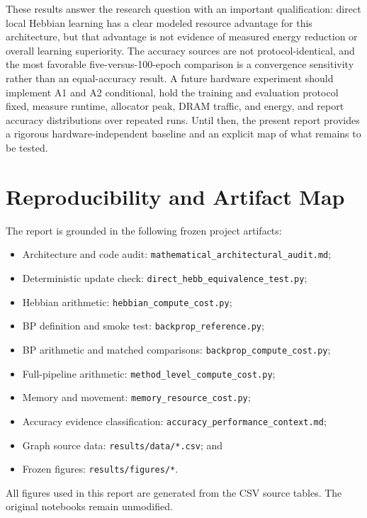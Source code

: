 \documentclass{article}
\begin{document}
    These results answer the research question with an important qualification: direct local Hebbian learning has a clear modeled resource advantage for this architecture, but that advantage is not evidence of measured energy reduction or overall learning superiority. The accuracy sources are not protocol-identical, and the most favorable five-versus-100-epoch comparison is a convergence sensitivity rather than an equal-accuracy result. A future hardware experiment should implement A1 and A2 conditional, hold the training and evaluation protocol fixed, measure runtime, allocator peak, DRAM traffic, and energy, and report accuracy distributions over repeated runs. Until then, the present report provides a rigorous hardware-independent baseline and an explicit map of what remains to be tested.
    
    \section*{Reproducibility and Artifact Map}
    
    The report is grounded in the following frozen project artifacts:
    \begin{itemize}[noitemsep]
    \item Architecture and code audit: \texttt{mathematical\_\allowbreak architectural\_\allowbreak audit.md};
    \item Deterministic update check: \texttt{direct\_\allowbreak hebb\_\allowbreak equivalence\_\allowbreak test.py};
    \item Hebbian arithmetic: \texttt{hebbian\_\allowbreak compute\_\allowbreak cost.py};
    \item BP definition and smoke test: \texttt{backprop\_\allowbreak reference.py};
    \item BP arithmetic and matched comparisons: \texttt{backprop\_\allowbreak compute\_\allowbreak cost.py};
    \item Full-pipeline arithmetic: \texttt{method\_\allowbreak level\_\allowbreak compute\_\allowbreak cost.py};
    \item Memory and movement: \texttt{memory\_\allowbreak resource\_\allowbreak cost.py};
    \item Accuracy evidence classification: \texttt{accuracy\_\allowbreak performance\_\allowbreak context.md};
    \item Graph source data: \texttt{results/data/*.csv}; and
    \item Frozen figures: \texttt{results/figures/*}.
    \end{itemize}
    All figures used in this report are generated from the CSV source tables. The original notebooks remain unmodified.
    
    
    
    
    
\end{document}
